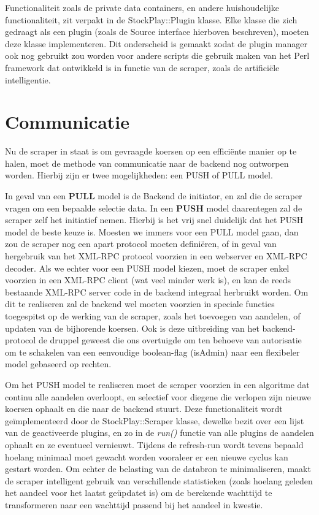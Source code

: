 Functionaliteit zoals de private data containers, en andere huishoudelijke functionaliteit, zit verpakt in de StockPlay::Plugin klasse. Elke klasse die zich gedraagt als een plugin (zoals de Source interface hierboven beschreven), moeten deze klasse implementeren. Dit onderscheid is gemaakt zodat de plugin manager ook nog gebruikt zou worden voor andere scripts die gebruik maken van het Perl framework dat ontwikkeld is in functie van de scraper, zoals de artifici\"ele intelligentie.

\section{Communicatie}

Nu de scraper in staat is om gevraagde koersen op een effici\"ente manier op te halen, moet de methode van communicatie naar de backend nog ontworpen worden. Hierbij zijn er twee mogelijkheden: een PUSH of PULL model.

In geval van een \textbf{PULL} model is de Backend de initiator, en zal die de scraper vragen om een bepaalde selectie data. In een \textbf{PUSH} model daarentegen zal de scraper zelf het initiatief nemen. Hierbij is het vrij snel duidelijk dat het PUSH model de beste keuze is. Moesten we immers voor een PULL model gaan, dan zou de scraper nog een apart protocol moeten defini\"eren, of in geval van hergebruik van het XML-RPC protocol voorzien in een webserver en XML-RPC decoder. Als we echter voor een PUSH model kiezen, moet de scraper enkel voorzien in een XML-RPC client (wat veel minder werk is), en kan de reeds bestaande XML-RPC server code in de backend integraal herbruikt worden.
Om dit te realiseren zal de backend wel moeten voorzien in speciale functies toegespitst op de werking van de scraper, zoals het toevoegen van aandelen, of updaten van de bijhorende koersen. Ook is deze uitbreiding van het backend-protocol de druppel geweest die ons overtuigde om ten behoeve van autorisatie om te schakelen van een eenvoudige boolean-flag (isAdmin) naar een flexibeler model gebaseerd op rechten.

Om het PUSH model te realiseren moet de scraper voorzien in een algoritme dat continu alle aandelen overloopt, en selectief voor diegene die verlopen zijn nieuwe koersen ophaalt en die naar de backend stuurt. Deze functionaliteit wordt ge\"implementeerd door de StockPlay::Scraper klasse, dewelke bezit over een lijst van de geactiveerde plugins, en zo in de \emph{run()} functie van alle plugins de aandelen ophaalt en ze eventueel vernieuwt. Tijdens de refresh-run wordt tevens bepaald hoelang minimaal moet gewacht worden vooraleer er een nieuwe cyclus kan gestart worden. Om echter de belasting van de databron te minimaliseren, maakt de scraper intelligent gebruik van verschillende statistieken (zoals hoelang geleden het aandeel voor het laatst geüpdatet is) om de berekende wachttijd te transformeren naar een wachttijd passend bij het aandeel in kwestie.


